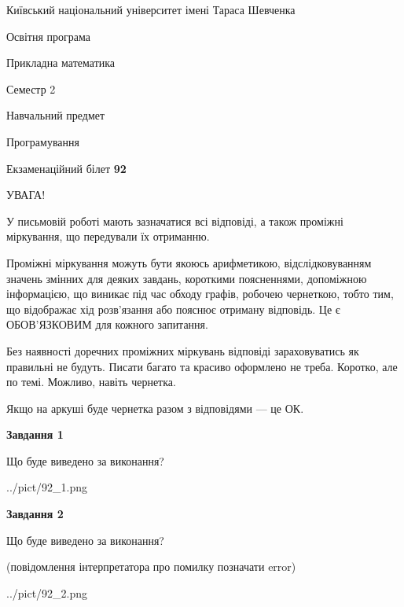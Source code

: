\documentclass[12pt, ukrainian]{article}
\begin{document}
{{\begin {small}\par
{ \center  Київський національний університет імені Тараса Шевченка \par}
{\parbox {5 cm}{Освітня програма \hfill}{\parbox {7 cm}{Прикладна математика\hfill}}\parbox {6 cm}{\hfill Семестр 2}}\par
{\parbox {5 cm} {Навчальний предмет \hfill}\parbox {7 cm}{Програмування \hfill}\parbox {6cm}{\hfill}\par}\vspace{-7pt} \end{small}}{\center Екзаменаційний білет \No \textbf
{ 92 }\par}}
{
\begin {large}
УВАГА!

У письмовій роботі мають зазначатися всі відповіді, а також проміжні міркування, що передували їх отриманню.

Проміжні міркування можуть бути якоюсь арифметикою, відслідковуванням зна\-чень змінних для деяких завдань,
короткими поясненнями, допоміжною інформацією, що виникає під час обходу графів, робочею чернеткою,
тобто тим, що відображає хід розв’язання або пояснює отриману відповідь.
Це є ОБОВ’ЯЗКОВИМ для кожного запитання.

Без наявності доречних проміжних міркувань відповіді зараховуватись як правиль\-ні не будуть.
Писати багато та красиво оформлено не треба. Коротко, але по темі. Можли\-во, навіть чернетка.

Якщо на аркуші буде чернетка разом з відповідями --- це ОК.

\newpage

{\begin {center}\textbf{Завдання 1}\end {center}}\par
Що буде виведено за виконання?\par
\begin{center}
	{../pict/92_1.png}
\end{center}
\newpage

{\begin {center}\textbf{Завдання 2}\end {center}}\par
Що буде виведено за виконання?\par
 (повідомлення інтерпретатора про помилку позначати error)\par
\begin{center}
	{../pict/92_2.png}
\end{center}
\newpage


\end{large}}
\end{document}
